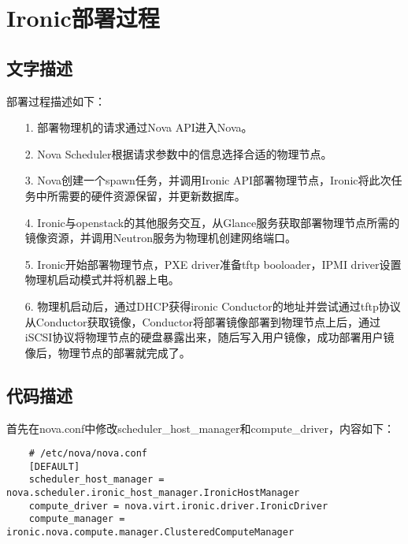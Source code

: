 \documentclass[a4paper,left=2.5cm,right=2.5cm,11pt]{article}
\begin{document}
\section{Ironic部署过程}
\subsection{文字描述}
	部署过程描述如下：
	\begin{itemize}
		\item[1.] 部署物理机的请求通过Nova API进入Nova。
		\item[2.] Nova Scheduler根据请求参数中的信息选择合适的物理节点。
		\item[3.] Nova创建一个spawn任务，并调用Ironic API部署物理节点，Ironic将此次任务中所需要的硬件资源保留，并更新数据库。
		\item[4.] Ironic与openstack的其他服务交互，从Glance服务获取部署物理节点所需的镜像资源，并调用Neutron服务为物理机创建网络端口。
		\item[5.] Ironic开始部署物理节点，PXE driver准备tftp booloader，IPMI driver设置物理机启动模式并将机器上电。
		\item[6.] 物理机启动后，通过DHCP获得ironic Conductor的地址并尝试通过tftp协议从Conductor获取镜像，Conductor将部署镜像部署到物理节点上后，通过iSCSI协议将物理节点的硬盘暴露出来，随后写入用户镜像，成功部署用户镜像后，物理节点的部署就完成了。
	\end{itemize}

\subsection{代码描述}
	首先在nova.conf中修改scheduler\_host\_manager和compute\_driver，内容如下：
	\begin{lstlisting}
	# /etc/nova/nova.conf
	[DEFAULT]
	scheduler_host_manager = nova.scheduler.ironic_host_manager.IronicHostManager
	compute_driver = nova.virt.ironic.driver.IronicDriver
	compute_manager = ironic.nova.compute.manager.ClusteredComputeManager
	\end{lstlisting}
\end{document}
